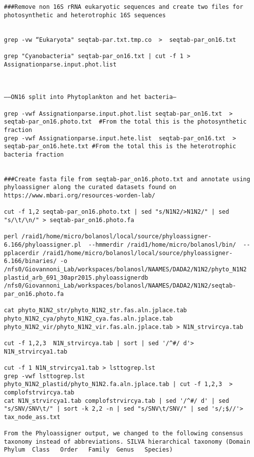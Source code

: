 \documentclass{article}
\begin{document}
\begin{lstlisting}[language=shellcmd,caption={Extracting only Photosynthetic sequences using shell commands}]
###Remove non 16S rRNA eukaryotic sequences and create two files for photosynthetic and heterotrophic 16S sequences


grep -vw “Eukaryota" seqtab-par.txt.tmp.co  >  seqtab-par_on16.txt

grep "Cyanobacteria" seqtab-par_on16.txt | cut -f 1 > Assignationparse.input.phot.list



——ON16 split into Phytoplankton and het bacteria— 

grep -vwf Assignationparse.input.phot.list seqtab-par_on16.txt  > seqtab-par_on16.photo.txt  #From the total this is the photosynthetic fraction
grep -vwf Assignationparse.input.hete.list  seqtab-par_on16.txt  > seqtab-par_on16.hete.txt #From the total this is the heterotrophic bacteria fraction


###Create fasta file from seqtab-par_on16.photo.txt and annotate using phyloassigner along the curated datasets found on https://www.mbari.org/resources-worden-lab/

cut -f 1,2 seqtab-par_on16.photo.txt | sed "s/N1N2/>N1N2/" | sed "s/\t/\n/" > seqtab-par_on16.photo.fa

perl /raid1/home/micro/bolanosl/local/source/phyloassigner-6.166/phyloassigner.pl  --hmmerdir /raid1/home/micro/bolanosl/bin/  --pplacerdir /raid1/home/micro/bolanosl/local/source/phyloassigner-6.166/binaries/ -o /nfs0/Giovannoni_Lab/workspaces/bolanosl/NAAMES/DADA2/N1N2/phyto_N1N2  plastid_arb_691_30apr2015.phyloassignerdb /nfs0/Giovannoni_Lab/workspaces/bolanosl/NAAMES/DADA2/N1N2/seqtab-par_on16.photo.fa

cat phyto_N1N2_str/phyto_N1N2_str.fas.aln.jplace.tab phyto_N1N2_cya/phyto_N1N2_cya.fas.aln.jplace.tab phyto_N1N2_vir/phyto_N1N2_vir.fas.aln.jplace.tab > N1N_strvircya.tab

cut -f 1,2,3  N1N_strvircya.tab | sort | sed '/^#/ d'> N1N_strvircya1.tab

cut -f 1 N1N_strvircya1.tab > lsttogrep.lst
grep -vwf lsttogrep.lst phyto_N1N2_plastid/phyto_N1N2.fa.aln.jplace.tab | cut -f 1,2,3  > complofstrvircya.tab
cat N1N_strvircya1.tab complofstrvircya.tab | sed '/^#/ d' | sed "s/SNV/SNV\t/" | sort -k 2,2 -n | sed "s/SNV\t/SNV/" | sed 's/;$//'> tax_node_ass.txt

From the Phyloassigner output, we changed to the following consensus taxonomy instead of abbreviations. SILVA hierarchical taxonomy (Domain	Phylum	Class	Order	Family	Genus	Species)


\end{lstlisting}
\end{document}
